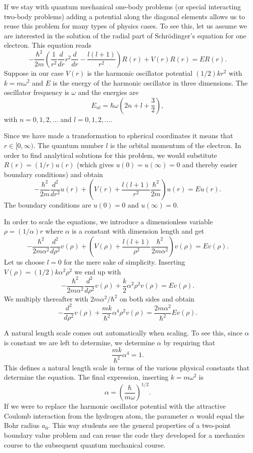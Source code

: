 \documentclass[graybox,envcountchap,sectrefs]{svmult}
\begin{document}
If we stay with quantum mechanical one-body problems (or
special interacting two-body problems) adding a potential along the
diagonal elements allows us to reuse this problem for many types of physics
cases.  To see this, let us assume we are interested in the solution
of the radial part of Schr\"odinger's equation for one electron. This
equation reads
\[
  -\frac{\hbar^2}{2 m} \left ( \frac{1}{r^2} \frac{d}{dr} r^2
  \frac{d}{dr} - \frac{l (l + 1)}{r^2} \right )R(r)
     + V(r) R(r) = E R(r).
\]
Suppose in our case $V(r)$ is the harmonic oscillator potential
$(1/2)kr^2$ with $k=m\omega^2$ and $E$ is the energy of the harmonic
oscillator in three dimensions.  The oscillator frequency is $\omega$
and the energies are
\[
E_{nl}=  \hbar \omega \left(2n+l+\frac{3}{2}\right),
\]
with $n=0,1,2,\dots$ and $l=0,1,2,\dots$.

Since we have made a transformation to spherical coordinates it means
that $r\in [0,\infty)$. The quantum number $l$ is the orbital momentum
  of the electron.  In order to find analytical solutions for this
  problem, we would substitute $R(r) = (1/r) u(r)$ (which gives
  $u(0)=u(\infty)=0$ and thereby easier boundary conditions) and
  obtain
\[
  -\frac{\hbar^2}{2 m} \frac{d^2}{dr^2} u(r)
       + \left ( V(r) + \frac{l (l + 1)}{r^2}\frac{\hbar^2}{2 m}
                                    \right ) u(r)  = E u(r) .
\]
The boundary conditions are $u(0)=0$ and $u(\infty)=0$.

In order to scale the equations, we introduce a dimensionless variable $\rho = (1/\alpha) r$
where $\alpha$ is a constant with dimension length and get
\[
  -\frac{\hbar^2}{2 m \alpha^2} \frac{d^2}{d\rho^2} v(\rho)
       + \left ( V(\rho) + \frac{l (l + 1)}{\rho^2}
         \frac{\hbar^2}{2 m\alpha^2} \right ) v(\rho)  = E v(\rho) .
\]
Let us choose $l=0$ for the mere sake of simplicity.
Inserting $V(\rho) = (1/2) k \alpha^2\rho^2$ we end up with
\[
  -\frac{\hbar^2}{2 m \alpha^2} \frac{d^2}{d\rho^2} v(\rho)
       + \frac{k}{2} \alpha^2\rho^2v(\rho)  = E v(\rho).
\]
We multiply thereafter with $2m\alpha^2/\hbar^2$ on both sides and obtain
\[
  -\frac{d^2}{d\rho^2} v(\rho)
       + \frac{mk}{\hbar^2} \alpha^4\rho^2v(\rho)  = \frac{2m\alpha^2}{\hbar^2}E v(\rho) .
\]

A natural length scale comes out automatically when scaling. To see this, since $\alpha$ is constant we are left to determine, 
we determine $\alpha$ by requiring that
\[
\frac{mk}{\hbar^2} \alpha^4 = 1.
\]
This defines a natural length scale in terms of the various physical
constants that determine the equation.  The final expression, inserting $k=m\omega^2$ is
\[
\alpha = \left(\frac{\hbar}{m\omega}\right)^{1/2}.
\]
If we were to replace the harmonic oscillator potential with the
attractive Coulomb interaction from the hydrogen atom, the  parameter $\alpha$ would equal the Bohr
radius $a_0$.  This way students see the general properties of a
two-point boundary value problem and can reuse the code they developed
for a mechanics course to the subsequent quantum mechanical course.
\end{document}
